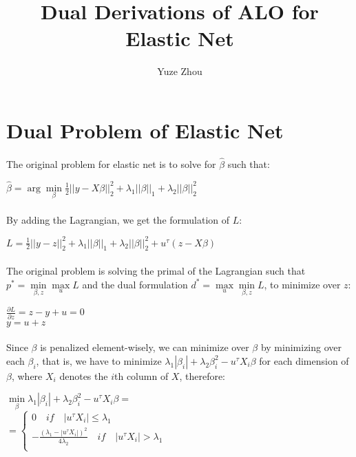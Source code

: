 \documentclass{article}
\title{Dual Derivations of ALO for Elastic Net}
\author{Yuze Zhou}
\begin{document}
\maketitle
\section{Dual Problem of Elastic Net}
\paragraph{}The original problem for elastic net is to solve for $\hat{\beta}$ such that:
\begin{center}
$\hat{\beta} = \arg \min\limits_{\beta} \frac{1}{2}||y-X\beta||_{2}^{2} + \lambda_{1}||\beta||_{1}+\lambda_{2}||\beta||_{2}^{2}$
\end{center}
\paragraph{}By adding the Lagrangian, we get the formulation of $L$:
\begin{center}
$L = \frac{1}{2}||y-z||_{2}^{2} + \lambda_{1}||\beta||_{1}+\lambda_{2}||\beta||_{2}^{2}+u^{\tau}(z-X\beta)$
\end{center}
\paragraph{}The original problem is solving the primal of the Lagrangian such that $p^{*} = \min\limits_{\beta,z}\max\limits_{u}L$ and the dual formulation $d^{*} = \max\limits_{u}\min\limits_{\beta,z}L$, to minimize over $z$:
\begin{center}
$\frac{\partial L}{\partial z} = z -y +u = 0$\\
$y = u + z$\\
\end{center}
\paragraph{}Since $\beta$ is penalized element-wisely, we can minimize over $\beta$ by minimizing over each $\beta_{i}$, that is, we have to minimize $\lambda_{1}|\beta_{i}| + \lambda_{2}\beta_{i}^{2} - u^{\tau}X_{i}\beta$ for each dimension of $\beta$, where $X_{i}$ denotes the $i$th column of $X$, therefore:
\begin{center}
$\min\limits_{\beta}\lambda_{1}|\beta_{i}| + \lambda_{2}\beta_{i}^{2} - u^{\tau}X_{i}\beta = $\\
$ $\\
$= \left\{
\begin{aligned}
0 \quad if \quad |u^{\tau}X_{i}| \leq \lambda_{1}\\
-\frac{(\lambda_{1}-|u^{\tau}X_{i}|)^{2}}{4\lambda_{2}} \quad if \quad |u^{\tau}X_{i}| > \lambda_{1}\\
\end{aligned}
\right.
$
\end{center}
\end{document}
